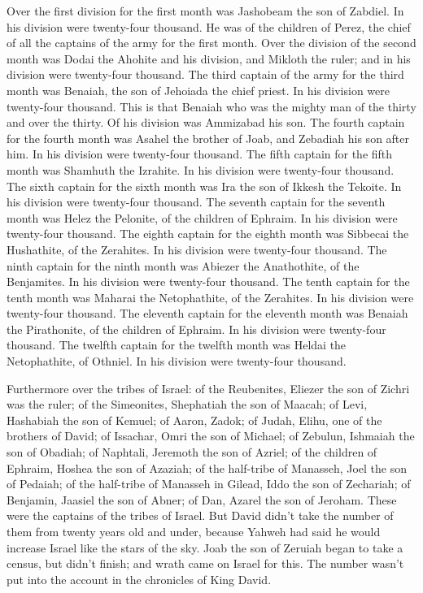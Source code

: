  Over the first division for the first month was Jashobeam
the son of Zabdiel. In his division were twenty-four thousand.
 He was of the children of Perez, the chief of all the
captains of the army for the first month.  Over the
division of the second month was Dodai the Ahohite and his division, and
Mikloth the ruler; and in his division were twenty-four thousand.
 The third captain of the army for the third month was
Benaiah, the son of Jehoiada the chief priest. In his division were
twenty-four thousand.  This is that Benaiah who was the
mighty man of the thirty and over the thirty. Of his division was
Ammizabad his son.  The fourth captain for the fourth
month was Asahel the brother of Joab, and Zebadiah his son after him. In
his division were twenty-four thousand.  The fifth captain
for the fifth month was Shamhuth the Izrahite. In his division were
twenty-four thousand.  The sixth captain for the sixth
month was Ira the son of Ikkesh the Tekoite. In his division were
twenty-four thousand.  The seventh captain for the
seventh month was Helez the Pelonite, of the children of Ephraim. In his
division were twenty-four thousand.  The eighth captain
for the eighth month was Sibbecai the Hushathite, of the Zerahites. In
his division were twenty-four thousand.  The ninth
captain for the ninth month was Abiezer the Anathothite, of the
Benjamites. In his division were twenty-four thousand. 
The tenth captain for the tenth month was Maharai the Netophathite, of
the Zerahites. In his division were twenty-four thousand.
 The eleventh captain for the eleventh month was Benaiah
the Pirathonite, of the children of Ephraim. In his division were
twenty-four thousand.  The twelfth captain for the
twelfth month was Heldai the Netophathite, of Othniel. In his division
were twenty-four thousand.

 Furthermore over the tribes of Israel: of the
Reubenites, Eliezer the son of Zichri was the ruler; of the Simeonites,
Shephatiah the son of Maacah;  of Levi, Hashabiah the son
of Kemuel; of Aaron, Zadok;  of Judah, Elihu, one of the
brothers of David; of Issachar, Omri the son of Michael; 
of Zebulun, Ishmaiah the son of Obadiah; of Naphtali, Jeremoth the son
of Azriel;  of the children of Ephraim, Hoshea the son of
Azaziah; of the half-tribe of Manasseh, Joel the son of Pedaiah;
 of the half-tribe of Manasseh in Gilead, Iddo the son of
Zechariah; of Benjamin, Jaasiel the son of Abner;  of
Dan, Azarel the son of Jeroham. These were the captains of the tribes of
Israel.  But David didn't take the number of them from
twenty years old and under, because Yahweh had said he would increase
Israel like the stars of the sky.  Joab the son of
Zeruiah began to take a census, but didn't finish; and wrath came on
Israel for this. The number wasn't put into the account in the
chronicles of King David.

